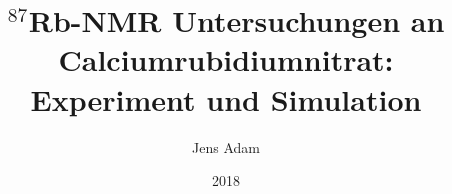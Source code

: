 \documentclass[
  BCOR=12mm,     %
  parskip=half,  %
  open=any,      %
  cleardoublepage=plain,  %
]{tudothesis}
\author{Jens Adam}
\title{$^\text{87}$Rb-NMR Untersuchungen an Calciumrubidiumnitrat:\\Experiment und Simulation}
\date{2018}
\begin{document}
\frontmatter
\maketitle

\makecorrectorpage

%
\tableofcontents

\mainmatter







\printbibliography

\appendix
% 
% 
% 

\backmatter


\cleardoublepage

\end{document}
